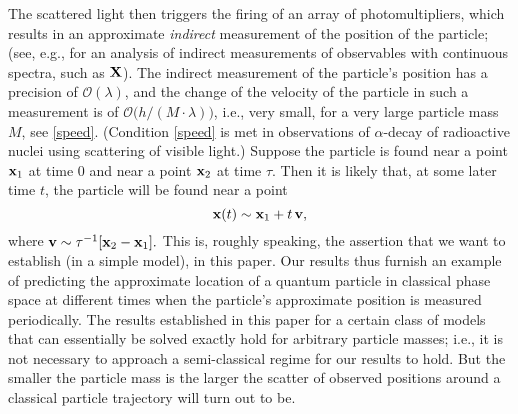 \documentclass[12pt]{article}
\begin{document}
The scattered light then triggers the firing of an array of photomultipliers, which results in an approximate \textit{indirect} measurement of the position of the particle; (see, e.g., \cite{BCFFS} for an analysis of indirect measurements of observables with continuous spectra, such as ${\bf{X}}$). The indirect measurement of the 
particle's position has a precision of $\mathcal{O}(\lambda)$, and the change of the velocity of the particle in such a 
measurement is of $\mathcal{O} \big(h/(M \cdot \lambda)\big)$, i.e., very small, for a very large particle mass $M$, 
see \eqref{speed}. (Condition \eqref{speed} is met in observations of $\alpha$-decay of radioactive nuclei using scattering of visible light.) Suppose the particle is found near a point ${\bf{x}}_1$ at time $0$ and near a point ${\bf{x}}_2$ 
at time $\tau$. Then it is likely that, at some later time $t$, the particle will be found near a point 
$${\bf{x}}(t) \sim {\bf{x}}_1+ t\, {\bf{v}},$$ 
where ${\bf{v}}\sim \tau^{-1} [{\bf{x}}_2 - {\bf{x}}_1].$ This is, roughly speaking, the assertion that we want to establish (in a simple model), in this paper. Our results thus furnish an example of predicting the approximate location of a 
quantum particle in classical phase space at different times when the particle's approximate position 
is measured periodically. The results established in this paper for a certain class of models that can essentially be solved exactly hold for arbitrary particle masses; i.e., it is not necessary to approach a semi-classical regime for our results to hold. But the smaller the particle mass is the larger the scatter of observed positions around a classical particle trajectory will turn out to be.
 
\end{document}
